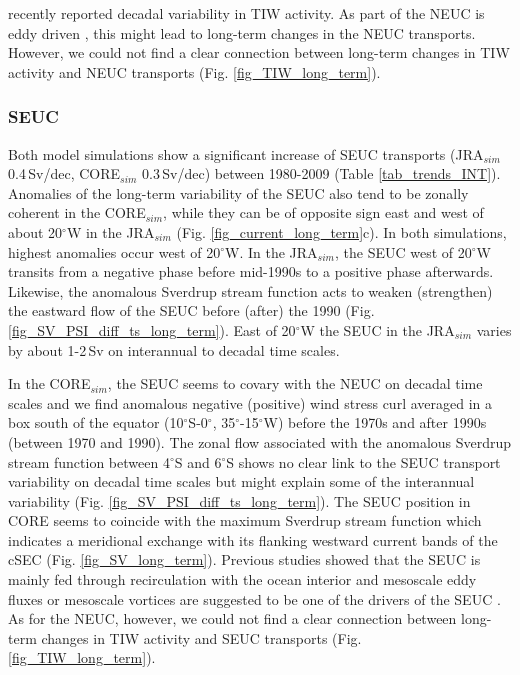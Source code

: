 \documentclass[os, manuscript]{copernicus}
\begin{document}
\cite{Tuchen2022a} recently reported decadal variability in TIW activity. As part of the NEUC is eddy driven \citep[e.g. ][]{Jochum2004b,Assene2020}, this might lead to long-term changes in the NEUC transports. However, we could not find a clear connection between long-term changes in TIW activity and NEUC transports (Fig. \ref{fig_TIW_long_term}).


\subsubsection{SEUC}
Both model simulations show a significant increase of SEUC transports (JRA$_{sim}$ 0.4$\,$Sv/dec, CORE$_{sim}$ 0.3$\,$Sv/dec) between 1980-2009 (Table \ref{tab_trends_INT}). Anomalies of the long-term variability of the SEUC also tend to be zonally coherent in the CORE$_{sim}$, while they can be of opposite sign east and west of about 20$^{\circ}$W in the JRA$_{sim}$ (Fig. \ref{fig_current_long_term}c). In both simulations, highest anomalies occur west of 20$^{\circ}$W. In the JRA$_{sim}$, the SEUC west of 20$^{\circ}$W transits from a negative phase before mid-1990s to a positive phase afterwards. Likewise, the anomalous Sverdrup stream function acts to weaken (strengthen) the eastward flow of the SEUC before (after) the 1990 (Fig. \ref{fig_SV_PSI_diff_ts_long_term}). East of 20$^{\circ}$W the SEUC in the JRA$_{sim}$ varies by about 1-2$ \, $Sv on interannual to decadal time scales. 

In the CORE$_{sim}$, the SEUC seems to covary with the NEUC on decadal time scales and we find anomalous negative (positive) wind stress curl averaged in a box south of the equator (10$^{\circ}$S-0$^{\circ}$, 35$^{\circ}$-15$^{\circ}$W) before the 1970s and after 1990s (between 1970 and 1990). The zonal flow associated with the anomalous Sverdrup stream function between 4$^{\circ}$S and 6$^{\circ}$S shows no clear link to the SEUC transport variability on decadal time scales but might explain some of the interannual variability (Fig. \ref{fig_SV_PSI_diff_ts_long_term}). The SEUC position in CORE seems to coincide with the maximum Sverdrup stream function which indicates a meridional exchange with its flanking westward current bands of the cSEC (Fig. \ref{fig_SV_long_term}). Previous studies showed that the SEUC is mainly fed through recirculation with the ocean interior \citep{Huettl2008,Fischer2008} and mesoscale eddy fluxes or mesoscale vortices are suggested to be one of the drivers of the SEUC \citep{Jochum2004b,Assene2020}. As for the NEUC, however, we could not find a clear connection between long-term changes in TIW activity and SEUC transports (Fig. \ref{fig_TIW_long_term}).
\end{document}

